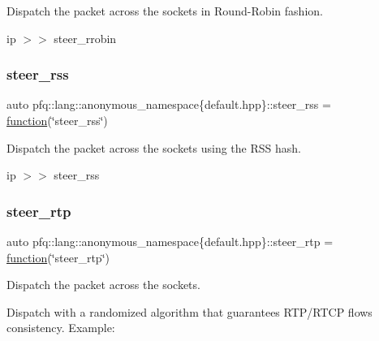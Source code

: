 Dispatch the packet across the sockets in Round-\/\+Robin fashion. 

ip $>$$>$ steer\+\_\+rrobin \mbox{\label{namespacepfq_1_1lang_1_1anonymous__namespace_02default_8hpp_03_ae5f71a205afe1a8e3ed959d4c555fcb9}} 
\subsubsection{\texorpdfstring{steer\+\_\+rss}{steer\_rss}}
{\footnotesize\ttfamily auto pfq\+::lang\+::anonymous\+\_\+namespace\{default.\+hpp\}\+::steer\+\_\+rss = \hyperlink{namespacepfq_1_1lang_a1a4638059d700ae08d0ca63886ff2bb3}{function}(\char`\"{}steer\+\_\+rss\char`\"{})}



Dispatch the packet across the sockets using the R\+SS hash. 

ip $>$$>$ steer\+\_\+rss \mbox{\label{namespacepfq_1_1lang_1_1anonymous__namespace_02default_8hpp_03_ac3bc5ec07d93fa5d9266e0e08191fe22}} 
\subsubsection{\texorpdfstring{steer\+\_\+rtp}{steer\_rtp}}
{\footnotesize\ttfamily auto pfq\+::lang\+::anonymous\+\_\+namespace\{default.\+hpp\}\+::steer\+\_\+rtp = \hyperlink{namespacepfq_1_1lang_a1a4638059d700ae08d0ca63886ff2bb3}{function}(\char`\"{}steer\+\_\+rtp\char`\"{})}



Dispatch the packet across the sockets. 

Dispatch with a randomized algorithm that guarantees R\+T\+P/\+R\+T\+CP flows consistency. Example\+:

